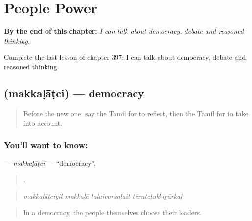 
\chapter{People Power}
\label{ch:ta-people-power}

\begin{chapteropening}
\textbf{By the end of this chapter:} \emph{I can talk about democracy, debate and reasoned thinking.}

Complete the last lesson of chapter 397: I can talk about democracy, debate and reasoned thinking.
\end{chapteropening}

\section[\texorpdfstring{\ta{மக்களாட்சி} (makkaḷāṭci)}{மக்களாட்சி (makkaḷāṭci)}]{ (makkaḷāṭci) — democracy}

\label{lesson:TA-C397-makkalatci}



\begin{quote}
Before the new one: say the Tamil for to reflect, then the Tamil for to take into account.
\end{quote}

\subsection*{You'll want to know: }
\textbf{} — \emph{makkaḷāṭci} — \textquotedblleft{}democracy\textquotedblright{}.

\begin{quote}
   .
\end{quote}

\begin{quote}
\emph{makkaḷāṭciyil makkaḷē talaivarkaḷait tērnteṭukkiṟārkaḷ.}
\end{quote}

\begin{quote}
In a democracy, the people themselves choose their leaders.
\end{quote}


